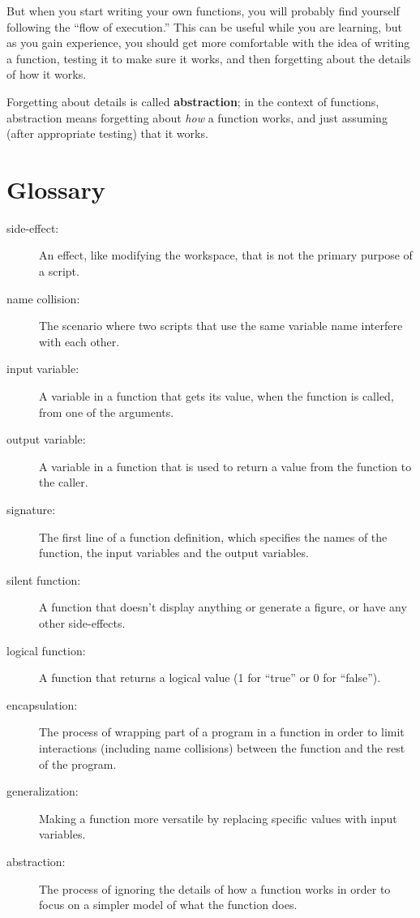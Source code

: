 \documentclass{book}
\begin{document}
But when you start writing your own functions, you will probably
find yourself following the ``flow of execution.''  This can
be useful while you are learning, but as you gain experience, you
should get more comfortable with the idea of writing a function,
testing it to make sure it works, and then forgetting about the
details of how it works.

Forgetting about details is called {\bf abstraction}; in the context
of functions, abstraction means forgetting about {\em how} a function
works, and just assuming (after appropriate testing) that it works.


\section{Glossary}

\begin{description}

\item[side-effect:] An effect, like modifying the workspace, that
is not the primary purpose of a script.

\item[name collision:] The scenario where two scripts that use the
same variable name interfere with each other.

\item[input variable:] A variable in a function that gets its value,
when the function is called, from one of the arguments.

\item[output variable:] A variable in a function that is used to
return a value from the function to the caller.

\item[signature:] The first line of a function definition, which
specifies the names of the function, the input variables and the
output variables.

\item[silent function:] A function that doesn't display anything
or generate a figure, or have any other side-effects.

\item[logical function:] A function that returns a logical value
(1 for ``true'' or 0 for ``false'').

\item[encapsulation:] The process of wrapping part of a program in
a function in order to limit interactions (including name collisions)
between the function and the rest of the program.

\item[generalization:] Making a function more versatile by replacing
specific values with input variables.

\item[abstraction:] The process of ignoring the details of how
a function works in order to focus on a simpler model of what the
function does.

\end{description}
\end{document}
